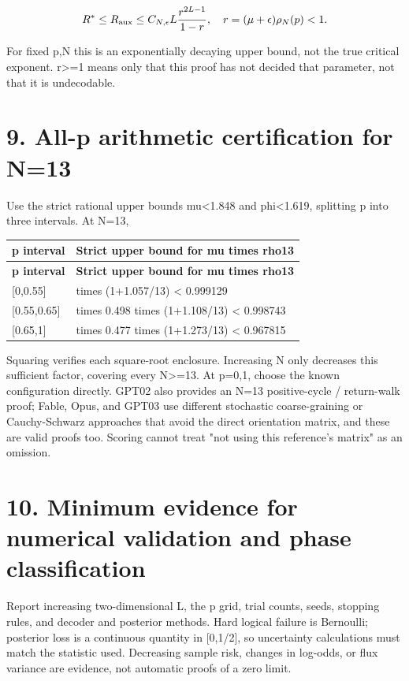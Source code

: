 \documentclass[11pt,a4paper]{article}
\begin{document}
\[
R^*\le R_{\rm aux}\le
C_{N,\epsilon}L\frac{r^{2L-1}}{1-r},
\quad r=(\mu+\epsilon)\rho_N(p)<1.
\]

For fixed p,N this is an exponentially decaying upper bound, not the true critical exponent. r>=1 means only that this proof has not decided that parameter, not that it is undecodable.

\section*{9. All-p arithmetic certification for N=13}

Use the strict rational upper bounds mu<1.848 and phi<1.619, splitting p into three intervals. At N=13,

{\fontsize{9}{12.5}\selectfont
\setlength{\tabcolsep}{2.2pt}

\begin{longtable}{>{\raggedright\arraybackslash}p{}>{\raggedright\arraybackslash}p{}}
\toprule
\textbf{p interval} & \textbf{Strict upper bound for mu times rho13}\tabularnewline
\midrule
\endfirsthead
\toprule
\textbf{p interval} & \textbf{Strict upper bound for mu times rho13}\tabularnewline
\midrule
\endhead
{}[0,0.55] & 0.924 times (1+1.057/\allowbreak{}13) < 0.999129\tabularnewline
{}[0.55,0.65] & 1.848 times 0.498 times (1+1.108/\allowbreak{}13) < 0.998743\tabularnewline
{}[0.65,1] & 1.848 times 0.477 times (1+1.273/\allowbreak{}13) < 0.967815\tabularnewline
\bottomrule
\end{longtable}
}

Squaring verifies each square-root enclosure. Increasing N only decreases this sufficient factor, covering every N>=13. At p=0,1, choose the known configuration directly. GPT02 also provides an N=13 positive-cycle /\allowbreak{} return-walk proof; Fable, Opus, and GPT03 use different stochastic coarse-graining or Cauchy-Schwarz approaches that avoid the direct orientation matrix, and these are valid proofs too. Scoring cannot treat "not using this reference's matrix" as an omission.

\section*{10. Minimum evidence for numerical validation and phase classification}

Report increasing two-dimensional L, the p grid, trial counts, seeds, stopping rules, and decoder and posterior methods. Hard logical failure is Bernoulli; posterior loss is a continuous quantity in [0,1/\allowbreak{}2], so uncertainty calculations must match the statistic used. Decreasing sample risk, changes in log-odds, or flux variance are evidence, not automatic proofs of a zero limit.
\end{document}
